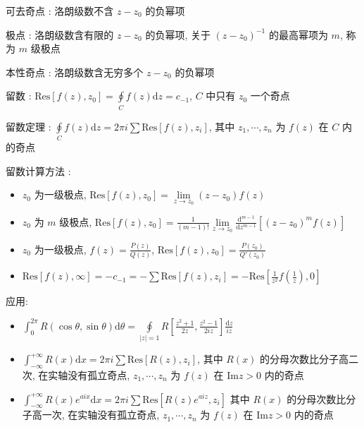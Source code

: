 \documentclass[UTF8, 12pt]{ctexart}
\begin{document}
	可去奇点 : 洛朗级数不含 $ z - z_{0} $ 的负幂项

	极点 : 洛朗级数含有限的 $ z - z_{0} $ 的负幂项, 关于 $ (z - z_{0})^{-1} $ 的最高幂项为 $ m $, 称为 $ m $ 级极点

	本性奇点 : 洛朗级数含无穷多个 $ z - z_{0} $ 的负幂项

	留数 : $ \mathrm{Res}[f(z), z_{0}] = \oint\limits_{C}f(z)\mathrm{d}z = c_{-1} $, $ C $ 中只有 $ z_{0} $ 一个奇点

	留数定理 : $ \oint\limits_{C}f(z)\mathrm{d}z = 2\pi i\sum\mathrm{Res}[f(z), z_{i}] $, 其中 $ z_{1}, \cdots, z_{n} $ 为 $ f(z) $ 在 $ C $ 内的奇点

	留数计算方法 : 
	\begin{itemize}[leftmargin = 4em]
		\item $ z_{0} $ 为一级极点, $ \mathrm{Res}[f(z), z_{0}] = \lim\limits_{z \to z_{0}}(z - z_{0})f(z) $
		\item $ z_{0} $ 为 $ m $ 级极点, $ \mathrm{Res}[f(z), z_{0}] = \frac{1}{(m-1)!} \lim\limits_{z \to z_{0}}\frac{\mathrm{d}^{m-1}}{\mathrm{d}z^{m-1}}[(z-z_{0})^{m}f(z)] $
		\item $ z_{0} $ 为一级极点, $ f(z) = \frac{P(z)}{Q(z)} $, $ \mathrm{Res}[f(z), z_{0}] = \frac{P(z_{0})}{Q'(z_{0})} $
		\item $ \mathrm{Res}[f(z), \infty] = -c_{-1} = -\sum\mathrm{Res}[f(z), z_{i}] = -\mathrm{Res}[\frac{1}{z^{2}}f\left(\frac{1}{z}\right), 0]$
	\end{itemize}

	应用:
	\begin{itemize}[leftmargin = 4em]
		\item $ \int_{0}^{2\pi}R(\cos\theta, \sin\theta)\mathrm{d}\theta = \oint\limits_{|z|=1}R[\frac{z^{2}+1}{2z}, \frac{z^{2}-1}{2iz}]\frac{\mathrm{d}z}{iz} $
		\item $ \int_{-\infty}^{+\infty}R(x)\mathrm{d}x = 2\pi i\sum\mathrm{Res}[R(z), z_{i}] $, 其中 $ R(x) $ 的分母次数比分子高二次, 在实轴没有孤立奇点, $ z_{1}, \cdots, z_{n} $ 为 $ f(z) $ 在 $ \mathrm{Im}z > 0 $ 内的奇点
		\item $ \int_{-\infty}^{+\infty}R(x)e^{aix}\mathrm{d}x = 2\pi i\sum\mathrm{Res}[R(z)e^{aiz}, z_{i}] $ 其中 $ R(x) $ 的分母次数比分子高一次, 在实轴没有孤立奇点, $ z_{1}, \cdots, z_{n} $ 为 $ f(z) $ 在 $ \mathrm{Im}z > 0 $ 内的奇点
	\end{itemize}
	
\end{document}
